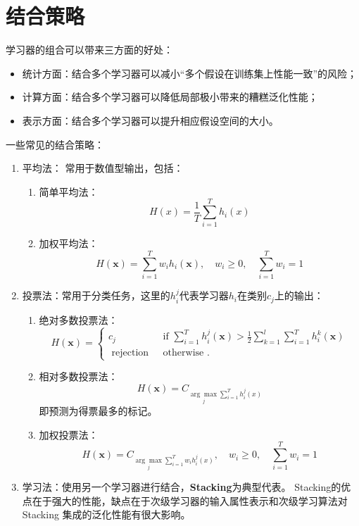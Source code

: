 \section{结合策略}\label{sec:8.4}
学习器的组合可以带来三方面的好处：
\begin{itemize}
    \item 统计方面：结合多个学习器可以减小“多个假设在训练集上性能一致”的风险；
    \item 计算方面：结合多个学习器可以降低局部极小带来的糟糕泛化性能；
    \item 表示方面：结合多个学习器可以提升相应假设空间的大小。
\end{itemize}
\begin{figure}[!htbp]
	\centering
\end{figure}
一些常见的结合策略：
\begin{enumerate}
    \item 平均法：
    常用于数值型输出，包括：
    \begin{enumerate}
        \item 简单平均法：\[H(x) = \frac{1}{T}\sum_{i=1}^T h_i(x)\]
        
        \item 加权平均法：\[
H(\boldsymbol{x})=\sum_{i=1}^{T} w_{i} h_{i}(\boldsymbol{x}), \quad w_{i} \geq 0 
,\quad \sum_{i=1}^{T} w_{i}=1
\]
    \end{enumerate}
    \item 投票法：常用于分类任务，这里的$h_i^j$代表学习器$h_i$在类别$c_j$上的输出：
    \begin{enumerate}
        \item 绝对多数投票法：\[
H(\boldsymbol{x})=\left\{\begin{array}{ll}c_{j} & \text { if } \sum_{i=1}^{T} h_{i}^{j}(\boldsymbol{x})>\frac{1}{2} \sum_{k=1}^{l} \sum_{i=1}^{T} h_{i}^{k}(\boldsymbol{x}) \\ \text { rejection } & \text { otherwise } .\end{array}\right.
\]
        \item 相对多数投票法：\[H(\boldsymbol x) = C_{\underset{j}{\arg \max }\sum_{i=1}^{T}h_i^j(x)}\]即预测为得票最多的标记。
        
        \item 加权投票法：\[H(\boldsymbol x) = C_{\underset{j}{\arg \max}\sum_{i=1}^{T} w_i h_i^j(x)}, \quad w_{i} \geq 0 
,\quad \sum_{i=1}^{T} w_{i}=1\]
    \end{enumerate}
    \item 学习法：使用另一个学习器进行结合，\textbf{Stacking}为典型代表。
    Stacking的优点在于强大的性能，缺点在于次级学习器的输入属性表示和次级学习算法对 Stacking 集成的泛化性能有很大影响。
\end{enumerate}

